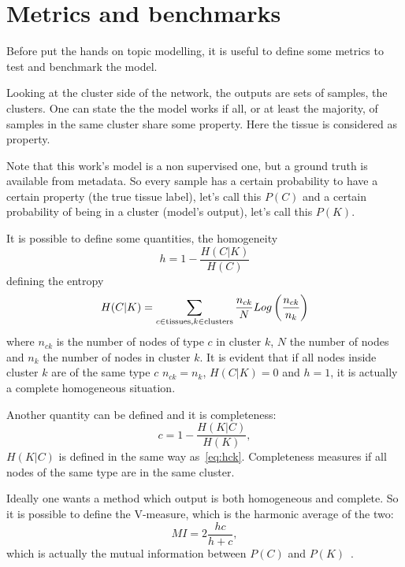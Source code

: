 \section{Metrics and benchmarks}
Before put the hands on topic modelling, it is useful to define some metrics to test and benchmark the model.

Looking at the cluster side of the network, the outputs are sets of samples, the clusters. One can state the the model works if all, or at least the majority, of samples in the same cluster share some property. Here the tissue is considered as property.

Note that this work's model is a non supervised one, but a ground truth is available from metadata. So every sample has a certain probability to have a certain property (the true tissue label), let's call this $P(C)$ and a certain probability of being in a cluster (model's output), let's call this $P(K)$.

It is possible to define some quantities, the homogeneity
\begin{equation}\label{eq:homogeneity}
    h=1-\frac{H(C|K)}{H(C)}
\end{equation}
defining the entropy
\begin{equation}\label{eq:hck}
    H(C|K)=\sum_{c\in \mathrm{tissues},\\ k \in \mathrm{clusters}}\frac{n_{c k}}{N}Log\left(\frac{n_{c k}}{n_k}\right)
\end{equation}
where $n_{c k}$ is the number of nodes of type $c$ in cluster $k$, $N$ the number of nodes and $n_k$ the number of nodes in cluster $k$. It is evident that if all nodes inside cluster $k$ are of the same type $c$ $n_{c k}=n_{k}$, $H(C|K)=0$ and $h=1$, it is actually a complete homogeneous situation.

Another quantity can be defined and it is completeness:
\begin{equation}\label{eq:completness}
    c=1-\frac{H(K|C)}{H(K)},
\end{equation}
$H(K|C)$ is defined in the same way as~\ref{eq:hck}. Completeness measures if all nodes of the same type are in the same cluster.

Ideally one wants a method which output is both homogeneous and complete. So it is possible to define the V-measure, which is the harmonic average of the two:
\begin{equation}\label{eq:mutualinformation}
    MI=2\frac{h c}{h + c},
\end{equation}
which is actually the mutual information between $P(C)$ and $P(K)$~\cite{rosenberg2007v}.

